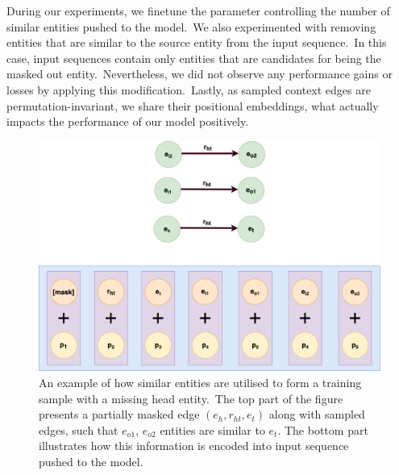 \documentclass[longabstract, english, mgr]{iithesis}
\theoremstyle{default_theorem_style}\newtheorem{theorem}{Theorem}
\theoremstyle{default_theorem_style}\newtheorem{definition}{Definition}
\begin{document}
\noindent During our experiments, we finetune the parameter controlling the number of similar entities pushed to
the model.\ We also experimented with removing entities that are similar to the source entity from the input
sequence.\ In this case, input sequences contain only entities that are candidates for being the masked out
entity.\ Nevertheless, we did not observe any performance gains or losses by applying this modification.\ Lastly,
as sampled context edges are permutation-invariant, we share their positional embeddings, what actually impacts
the performance of our model positively.


\begin{figure}[h!]
\centering
\includegraphics[scale=0.27]{similarity_based_model_input_variant}
\caption{An example of how similar entities are utilised to form a training sample with a missing head
entity.\ The top part of the figure presents a partially masked edge $(e_h, r_{ht}, e_t)$ along with sampled edges,
such that $e_{o1}$, $e_{o2}$ entities are similar to $e_t$. The bottom part illustrates how this information is
encoded into input sequence pushed to the model.\newline
}
\label{fig:similarity_based_model_input_variant}
\end{figure}
\end{document}
